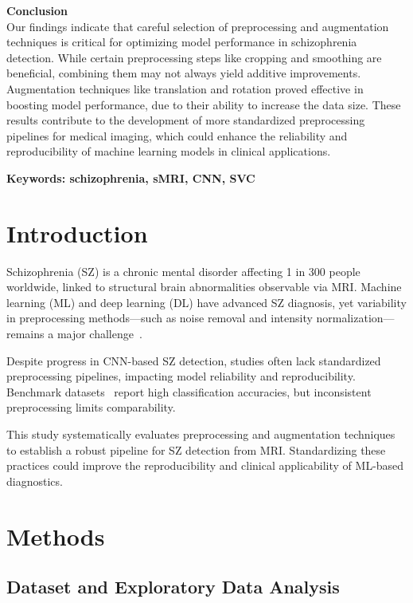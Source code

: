 \textbf{Conclusion}\\
Our findings indicate that careful selection of preprocessing and augmentation techniques is critical for optimizing model performance in schizophrenia detection. While certain preprocessing steps like cropping and smoothing are beneficial, combining them may not always yield additive improvements. Augmentation techniques like translation and rotation proved effective in boosting model performance, due to their ability to increase the data size. These results contribute to the development of more standardized preprocessing pipelines for medical imaging, which could enhance the reliability and reproducibility of machine learning models in clinical applications.

\textbf{Keywords: schizophrenia, sMRI, CNN, SVC}

\section{Introduction}

Schizophrenia (SZ) is a chronic mental disorder affecting 1 in 300 people worldwide, linked to structural brain abnormalities observable via MRI. Machine learning (ML) and deep learning (DL) have advanced SZ diagnosis, yet variability in preprocessing methods—such as noise removal and intensity normalization—remains a major challenge~\cite{Benli2023, Zhang2022}.

Despite progress in CNN-based SZ detection, studies often lack standardized preprocessing pipelines, impacting model reliability and reproducibility. Benchmark datasets~\cite{Oh2020, Verma2023} report high classification accuracies, but inconsistent preprocessing limits comparability.

This study systematically evaluates preprocessing and augmentation techniques to establish a robust pipeline for SZ detection from MRI. Standardizing these practices could improve the reproducibility and clinical applicability of ML-based diagnostics.

\section{Methods}

\subsection{Dataset and Exploratory Data Analysis}

